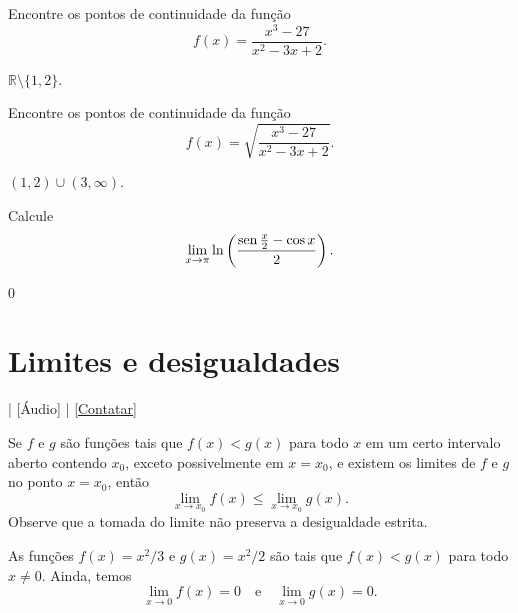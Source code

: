 \begin{exer}
  Encontre os pontos de continuidade da função
  \begin{equation}
    f(x) = \frac{x^3 - 27}{x^2 - 3x + 2}.
  \end{equation}
\end{exer}
\begin{resp}
  $\mathbb{R}\setminus\{1,2\}$.
\end{resp}

\begin{exer}
  Encontre os pontos de continuidade da função
  \begin{equation}
    f(x) = \sqrt{\frac{x^3 - 27}{x^2 - 3x + 2}}.
  \end{equation}
\end{exer}
\begin{resp}
  $(1, 2)\cup (3, \infty)$.
\end{resp}

\begin{exer}
  Calcule
  \begin{equation}
    \lim_{x\to \pi} \ln \left(\frac{\operatorname{sen} \frac{x}{2} - \cos x}{2}\right).
  \end{equation}
\end{exer}
\begin{resp}
  $0$
\end{resp}

\section{Limites e desigualdades}\label{cap_lim_sec_limdes}

\begin{flushright}
  [Vídeo] | [Áudio] | \href{https://phkonzen.github.io/notas/contato.html}{[Contatar]}
\end{flushright}

Se $f$ e $g$ são funções tais que $f(x)<g(x)$ para todo $x$ em um certo intervalo aberto contendo $x_0$, exceto possivelmente em $x=x_0$, e existem os limites de $f$ e $g$ no ponto $x=x_0$, então
\begin{equation}
  \lim_{x\to x_0} f(x) \leq \lim_{x\to x_0} g(x).
\end{equation}
Observe que a tomada do limite não preserva a desigualdade estrita.

\begin{exer}
  As funções $f(x) = x^2/3$ e $g(x) = x^2/2$ são tais que $f(x) < g(x)$ para todo $x\neq 0$. Ainda, temos
  \begin{equation}
    \lim_{x\to 0} f(x) = 0\quad\text{e}\quad\lim_{x\to 0} g(x) = 0.
  \end{equation}
\end{exer}

